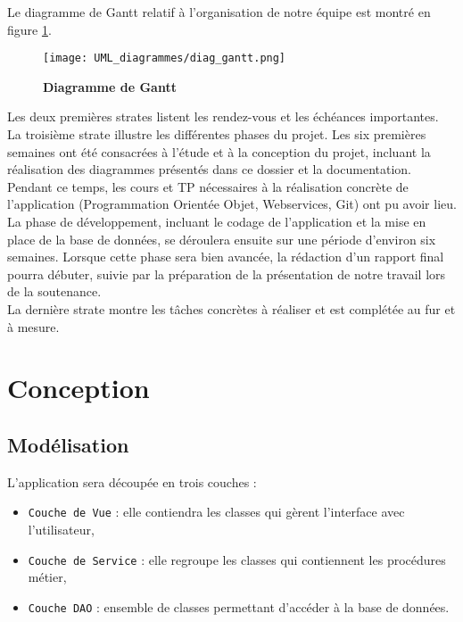 \documentclass[11pt]{article}
\begin{document}
\bigbreak

Le diagramme de Gantt relatif à l'organisation de notre équipe est montré en figure \ref{UML_gantt}.\\


\begin{figure}[H]
    \caption{\textbf{Diagramme de Gantt}}
    \label{UML_gantt}
    \centering
    \texttt{[image: UML\_diagrammes/diag\_gantt.png]}
\end{figure}

Les deux premières strates listent les rendez-vous et les échéances importantes. \\

La troisième strate illustre les différentes phases du projet. Les six premières semaines ont été consacrées à l'étude et à la conception du projet, incluant la réalisation des diagrammes présentés dans ce dossier et la documentation. Pendant ce temps, les cours et TP nécessaires à la réalisation concrète de l'application (Programmation Orientée Objet, Webservices, Git) ont pu avoir lieu. La phase de développement, incluant le codage de l'application et la mise en place de la base de données, se déroulera ensuite sur une période d'environ six semaines. Lorsque cette phase sera bien avancée, la rédaction d'un rapport final pourra débuter, suivie par la préparation de la présentation de notre travail lors de la soutenance.\\

La dernière strate montre les tâches concrètes à réaliser et est complétée au fur et à mesure.\\






\newpage
\section{Conception}

\subsection{Modélisation}

L'application sera découpée en trois couches :
\begin{itemize}
    \item \texttt{Couche de Vue} : elle contiendra les classes qui gèrent l'interface avec l'utilisateur,
    \item \texttt{Couche de Service} : elle regroupe les classes qui contiennent les procédures métier,
    \item \texttt{Couche DAO} : ensemble de classes permettant d'accéder à la base de données.
\end{itemize}
\end{document}
